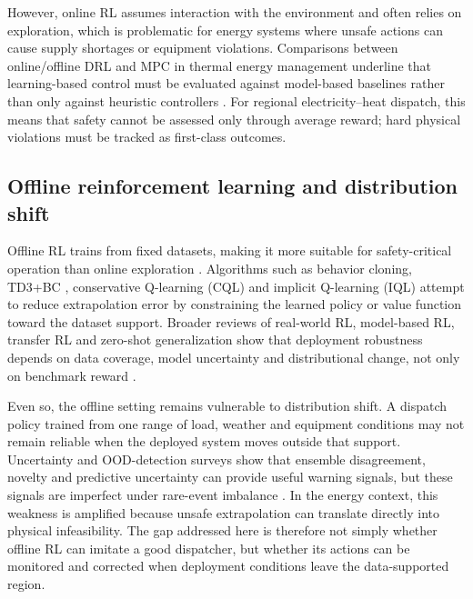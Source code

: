 \documentclass[preprint,12pt]{elsarticle}
\begin{document}
However, online RL assumes interaction with the environment and often relies on exploration, which is problematic for energy systems where unsafe actions can cause supply shortages or equipment violations. Comparisons between online/offline DRL and MPC in thermal energy management underline that learning-based control must be evaluated against model-based baselines rather than only against heuristic controllers \cite{Blad2022OnlineOfflineDRLMPC}. For regional electricity--heat dispatch, this means that safety cannot be assessed only through average reward; hard physical violations must be tracked as first-class outcomes.

\subsection{Offline reinforcement learning and distribution shift}

Offline RL trains from fixed datasets, making it more suitable for safety-critical operation than online exploration \cite{Levine2020OfflineRL,Prudencio2024OfflineRLSurvey}. Algorithms such as behavior cloning, TD3+BC \cite{Fujimoto2021TD3BC}, conservative Q-learning (CQL) \cite{Kumar2020CQL} and implicit Q-learning (IQL) \cite{Kostrikov2022IQL} attempt to reduce extrapolation error by constraining the learned policy or value function toward the dataset support. Broader reviews of real-world RL, model-based RL, transfer RL and zero-shot generalization show that deployment robustness depends on data coverage, model uncertainty and distributional change, not only on benchmark reward \cite{DulacArnold2021RealWorldRLChallenges,Moerland2023ModelBasedRLSurvey,Zhu2023TransferRLSurvey,Kirk2023ZeroShotDRLSurvey}.

Even so, the offline setting remains vulnerable to distribution shift. A dispatch policy trained from one range of load, weather and equipment conditions may not remain reliable when the deployed system moves outside that support. Uncertainty and OOD-detection surveys show that ensemble disagreement, novelty and predictive uncertainty can provide useful warning signals, but these signals are imperfect under rare-event imbalance \cite{Gawlikowski2023UncertaintyDNNSurvey,Yang2022OODDetectionReview,Ganaie2022EnsembleDeepLearningReview}. In the energy context, this weakness is amplified because unsafe extrapolation can translate directly into physical infeasibility. The gap addressed here is therefore not simply whether offline RL can imitate a good dispatcher, but whether its actions can be monitored and corrected when deployment conditions leave the data-supported region.
\end{document}
